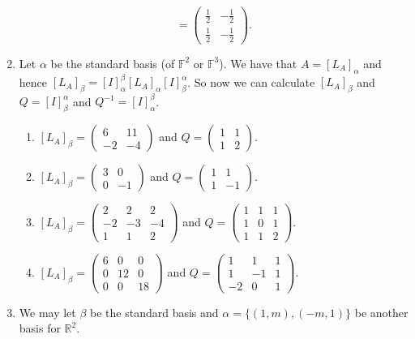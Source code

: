 \begin{enumerate}
\[=\left(\begin{array}{cc}\frac{1}{2}&-\frac{1}{2}\\\frac{1}{2}&-\frac{1}{2}\end{array}\right).\]
\item Let $\alpha $ be the standard basis (of $\mathbb{F}^2$ or $\mathbb{F}^3$). We have that $A=[L_A]_{\alpha}$ and hence $[L_A]_{\beta}=[I]_{\alpha}^{\beta}[L_A]_{\alpha}[I]_{\beta}^{\alpha}$. So now we can calculate $[L_A]_{\beta}$ and $Q=[I]_{\beta}^{\alpha}$ and $Q^{-1}=[I]_{\alpha}^{\beta}$.
\begin{enumerate}
\item $[L_A]_{\beta}=\left(\begin{array}{cc}6&11\\-2&-4\end{array}\right)$ and $Q=\left(\begin{array}{cc}1&1\\1&2\end{array}\right)$.
\item $[L_A]_{\beta}=\left(\begin{array}{cc}3&0\\0&-1\end{array}\right)$ and $Q=\left(\begin{array}{cc}1&1\\1&-1\end{array}\right)$.
\item $[L_A]_{\beta}=\left(\begin{array}{ccc}2&2&2\\-2&-3&-4\\1&1&2\end{array}\right)$ and $Q=\left(\begin{array}{ccc}1&1&1\\1&0&1\\1&1&2\end{array}\right)$.
\item $[L_A]_{\beta}=\left(\begin{array}{ccc}6&0&0\\0&12&0\\0&0&18\end{array}\right)$ and $Q=\left(\begin{array}{ccc}1&1&1\\1&-1&1\\-2&0&1\end{array}\right)$.
\end{enumerate}
\item We may let $\beta $ be the standard basis and $\alpha=\{(1,m),(-m,1)\}$ be another basis for $\mathbb{R}^2$.

\end{enumerate}
